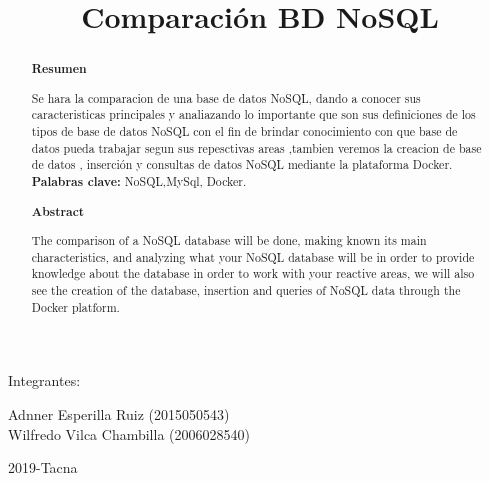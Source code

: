 \documentclass[%
 reprint,
 amsmath,amssymb,
 aps,
]{revtex4-1}
\begin{document}
\begin{titlepage}
\begin{center}
\vspace*{0.2in}
\vspace*{0.1in}
\begin{large}
Integrantes: \\
\begin{flushleft}
Adnner Esperilla Ruiz		\hfill	(2015050543) \\
Wilfredo Vilca Chambilla		\hfill	(2006028540) \\
\vspace*{0.5in}
\begin{center}
2019-Tacna\\
\end{center}
\vspace*{2in}
\end{flushleft}
\end{large}
\end{center}

\end{titlepage}


\title{Comparación BD NoSQL}
\begin{abstract}
\begin{center}
\textbf{Resumen}
\end{center}

Se hara la comparacion de una base de datos NoSQL, dando a conocer sus caracteristicas principales y analiazando lo importante que son sus definiciones de los tipos de base de datos NoSQL con el fin de brindar conocimiento con que base de datos pueda trabajar segun sus repesctivas areas ,tambien veremos la creacion de base de datos , inserción y consultas de datos NoSQL mediante la plataforma Docker.\\

\textbf{Palabras clave:}   NoSQL,MySql, Docker.\\

\begin{center}
\textbf{Abstract}
\end{center}
The comparison of a NoSQL database will be done, making known its main characteristics, and analyzing what your NoSQL database will be in order to provide knowledge about the database in order to work with your reactive areas, we will also see the creation of the database, insertion and queries of NoSQL data through the Docker platform. \\

\end{abstract}



\maketitle
\end{document}
